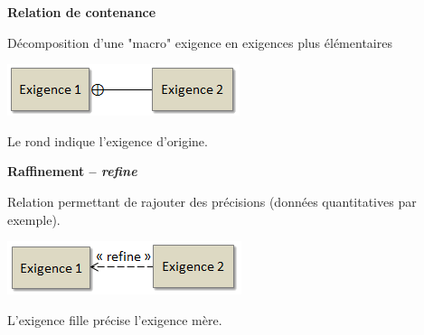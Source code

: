 \documentclass[11pt,oneside]{article}
\begin{document}
\begin{defi}
\textbf{Relation de contenance}

Décomposition d'une "macro" exigence en exigences plus élémentaires

\begin{minipage}[c]{.6\linewidth}
\end{minipage} \hfill
\begin{minipage}[c]{.3\linewidth}
\begin{center}
\includegraphics[width=.9\textwidth]{png/cont}
\end{center}
\end{minipage}

\end{defi}
Le rond indique l'exigence d'origine.



\begin{defi}
\textbf{Raffinement -- \textit{refine}}

Relation permettant de rajouter des précisions (données quantitatives par exemple). 

\begin{minipage}[c]{.6\linewidth}
\end{minipage} \hfill
\begin{minipage}[c]{.3\linewidth}
\begin{center}
\includegraphics[width=.9\textwidth]{png/ref}
\end{center}
\end{minipage}
\end{defi}

L'exigence fille précise l'exigence mère. 
\end{document}
